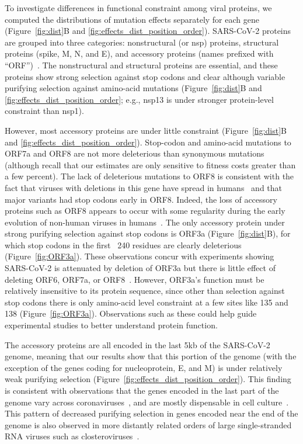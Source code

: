 \documentclass[9pt,twocolumn,twoside]{gsajnl_modified}
\begin{document}
To investigate differences in functional constraint among viral proteins, we computed the distributions of mutation effects separately for each gene (Figure~\ref{fig:dist}B and \ref{fig:effects_dist_position_order}).
SARS-CoV-2 proteins are grouped into three categories: nonstructural (or nsp) proteins, structural proteins (spike, M, N, and E), and accessory proteins (names prefixed with ``ORF'')~\citep{v2021coronavirus}.
The nonstructural and structural proteins are essential, and these proteins show strong selection against stop codons and clear although variable purifying selection against amino-acid mutations (Figure~\ref{fig:dist}B and \ref{fig:effects_dist_position_order}; e.g., nsp13 is under stronger protein-level constraint than nsp1).

However, most accessory proteins are under little constraint (Figure~\ref{fig:dist}B and \ref{fig:effects_dist_position_order}).
Stop-codon and amino-acid mutations to ORF7a and ORF8 are not more deleterious than synonymous mutations (although recall that our estimates are only sensitive to fitness costs greater than a few percent).
The lack of deleterious mutations to ORF8 is consistent with the fact that viruses with deletions in this gene have spread in humans~\citep{su2020discovery} and that major variants had stop codons early in ORF8.
Indeed, the loss of accessory proteins such as ORF8 appears to occur with some regularity during the early evolution of non-human viruses in humans~\citep{rochman2022molecular}.
The only accessory protein under strong purifying selection against stop codons is ORF3a (Figure~\ref{fig:dist}B), for which stop codons in the first ~240 residues are clearly deleterious (Figure~\ref{fig:ORF3a}).
These observations concur with experiments showing SARS-CoV-2 is attenuated by deletion of ORF3a but there is little effect of deleting ORF6, ORF7a, or ORF8~\citep{mcgrath2022sars,silvas2021contribution,liu2022live}.
However, ORF3a's function must be relatively insensitive to its protein sequence, since other than selection against stop codons there is only amino-acid level constraint at a few sites like 135 and 138 (Figure~\ref{fig:ORF3a}).
Observations such as these could help guide experimental studies to better understand protein function.

The accessory proteins are all encoded in the last 5kb of the SARS-CoV-2 genome, meaning that our results show that this portion of the genome (with the exception of the genes coding for nucleoprotein, E, and M) is under relatively weak purifying selection (Figure~\ref{fig:effects_dist_position_order}).
This finding is consistent with observations that the genes encoded in the last part of the genome vary across coronaviruses~\citep{v2021coronavirus,llanes2020betacoronavirus}, and are mostly dispensable in cell culture~\citep{mcgrath2022sars,silvas2021contribution,liu2022live,liu2014accessory}.
This pattern of decreased purifying selection in genes encoded near the end of the genome is also observed in more distantly related orders of large single-stranded RNA viruses such as closteroviruses~\citep{wang2011genetic, dawson2013virus}.
\end{document}
